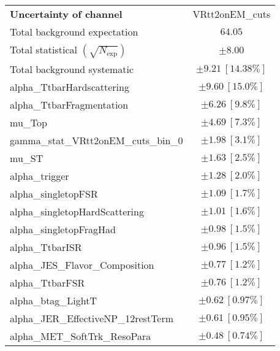 
\begin{table}
\begin{center}
\setlength{\tabcolsep}{0.0pc}
\begin{tabular*}{\textwidth}{@{\extracolsep{\fill}}lc}
\noalign{\smallskip}\hline\noalign{\smallskip}
{\textbf{Uncertainty of channel}}                                    & VRtt2onEM\_cuts            \\
\noalign{\smallskip}\hline\noalign{\smallskip}
Total background expectation             &  $64.05$       \\
\noalign{\smallskip}\hline\noalign{\smallskip}
Total statistical $(\sqrt{N_{\mathrm{exp}}})$              & $\pm 8.00$       \\
Total background systematic               & $\pm 9.21\ [14.38\%] $             \\
\noalign{\smallskip}\hline\noalign{\smallskip}
\noalign{\smallskip}\hline\noalign{\smallskip}
alpha\_TtbarHardscattering         & $\pm 9.60\ [15.0\%] $       \\
alpha\_TtbarFragmentation         & $\pm 6.26\ [9.8\%] $       \\
mu\_Top         & $\pm 4.69\ [7.3\%] $       \\
gamma\_stat\_VRtt2onEM\_cuts\_bin\_0         & $\pm 1.98\ [3.1\%] $       \\
mu\_ST         & $\pm 1.63\ [2.5\%] $       \\
alpha\_trigger         & $\pm 1.28\ [2.0\%] $       \\
alpha\_singletopFSR         & $\pm 1.09\ [1.7\%] $       \\
alpha\_singletopHardScattering         & $\pm 1.01\ [1.6\%] $       \\
alpha\_singletopFragHad         & $\pm 0.98\ [1.5\%] $       \\
alpha\_TtbarISR         & $\pm 0.96\ [1.5\%] $       \\
alpha\_JES\_Flavor\_Composition         & $\pm 0.77\ [1.2\%] $       \\
alpha\_TtbarFSR         & $\pm 0.76\ [1.2\%] $       \\
alpha\_btag\_LightT         & $\pm 0.62\ [0.97\%] $       \\
alpha\_JER\_EffectiveNP\_12restTerm         & $\pm 0.61\ [0.95\%] $       \\
alpha\_MET\_SoftTrk\_ResoPara         & $\pm 0.48\ [0.74\%] $       \\

\end{tabular*}
\end{center}
\end{table}
